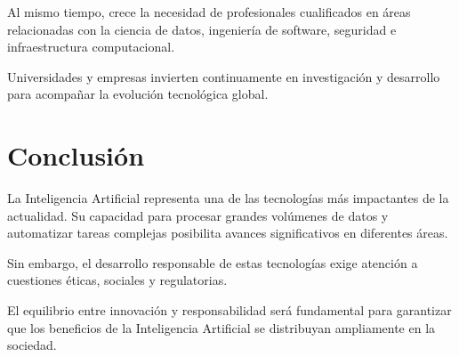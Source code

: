 \documentclass[11pt]{article}
\begin{document}
Al mismo tiempo, crece la necesidad de profesionales cualificados en áreas relacionadas con la
ciencia de datos, ingeniería de software, seguridad e infraestructura computacional.

Universidades y empresas invierten continuamente en investigación y desarrollo para
acompañar la evolución tecnológica global. 

\section{Conclusión}

La Inteligencia Artificial representa una de las tecnologías más impactantes de la actualidad. Su capacidad para procesar grandes volúmenes de datos y automatizar tareas complejas posibilita avances significativos en diferentes áreas.

Sin embargo, el desarrollo responsable de estas tecnologías exige atención a cuestiones éticas, sociales y regulatorias.

El equilibrio entre innovación y responsabilidad será fundamental para garantizar que los beneficios de la Inteligencia Artificial se distribuyan ampliamente en la sociedad.  
\end{document}
